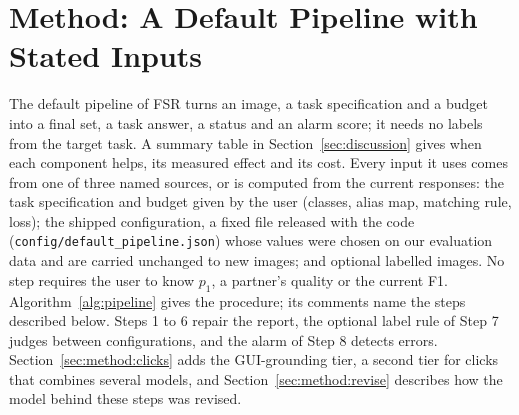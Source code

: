 \section{Method: A Default Pipeline with Stated Inputs}\label{sec:method}

The default pipeline of FSR turns an image, a task specification and a budget into a final set, a task answer, a status and an alarm score; it needs no labels from the target task. A summary table in Section~\ref{sec:discussion} gives when each component helps, its measured effect and its cost. Every input it uses comes from one of three named sources, or is computed from the current responses:  the task specification and budget given by the user (classes, alias map, matching rule, loss);  the shipped configuration, a fixed file released with the code (\texttt{config/default\_pipeline.json}) whose values were chosen on our evaluation data and are carried unchanged to new images; and  optional labelled images. No step requires the user to know $p_1$, a partner's quality or the current F1. Algorithm~\ref{alg:pipeline} gives the procedure; its comments name the steps described below. Steps 1 to 6 repair the report, the optional label rule of Step 7 judges between configurations, and the alarm of Step 8 detects errors. Section~\ref{sec:method:clicks} adds the GUI-grounding tier, a second tier for clicks that combines several models, and Section~\ref{sec:method:revise} describes how the model behind these steps was revised.

